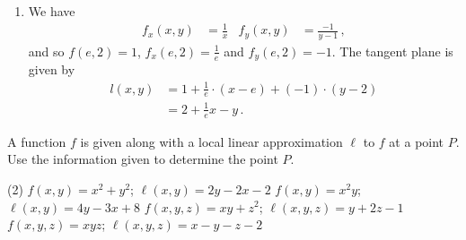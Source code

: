 \begin{solution}
\begin{enumerate}
\item
We have
\begin{align*}
f_x(x,y) &= \frac{1}{x} &
f_y(x,y) &= \frac{-1}{y-1}\,,
\end{align*}
and so $f(e, 2) = 1$, $f_x(e, 2) = \frac 1e$ and $f_y(e,2) = -1$. The tangent plane is given by
\begin{align*}
l(x,y) &= 1 +\frac 1e\cdot(x-e) +(-1)\cdot(y-2) \\
&= 2+\frac 1e x -y\,.
\end{align*}
\end{enumerate}
\end{solution}

\begin{question}
A function $f$ is given along with a local linear approximation $\ell$ to $f$ at a point $P$. Use the information given to determine the point $P$.
\begin{tasks}(2)
\task
$f(x,y) = x^2 + y^2$; $\ell(x,y) = 2y-2x-2$
\task
$f(x,y) = x^2y$; $\ell(x,y) = 4y-3x+8$
\task
$f(x,y,z) = xy + z^2$; $\ell(x,y,z) = y+2z-1$
\task
$f(x,y,z) = xyz$; $\ell(x,y,z) = x-y-z-2$
\end{tasks}
\end{question}

